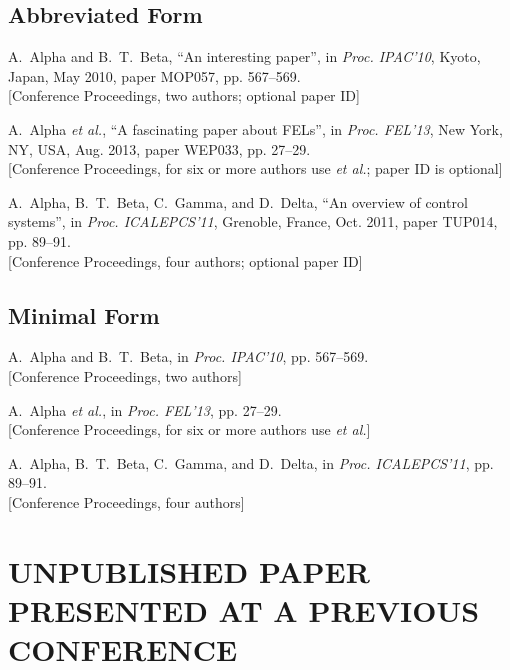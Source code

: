 \documentclass[a4paper,
              ]{jacow}
\begin{document}
\newpage
\subsection{Abbreviated Form}

\begin{thebibliography}{9} %
	A.~Alpha and B.~T.~Beta, “An interesting paper”, 
	in \textit{Proc. IPAC’10}, 
	Kyoto, Japan, May 2010, 
	paper MOP057, pp. 567--569.\\
	\textcolor{jgreen}{[Conference Proceedings, two authors; optional paper ID]}
	
	A.~Alpha \emph{et al.}, 
	“A fascinating paper about FELs”, 
	in \emph{Proc. FEL’13}, 
	New York, NY, USA, Aug. 2013, 
	paper WEP033, pp. 27--29.\\
	\textcolor{jgreen}{[Conference Proceedings, for six or more authors use \emph{et al.};	
		paper ID is optional]}
	
	A.~Alpha, B.~T.~Beta, C.~Gamma, and D.~Delta, 
	“An overview of control systems”, 
	in \emph{Proc. ICALEPCS’11}, Grenoble, France, Oct. 2011, 
	paper TUP014, pp. 89--91.\\
	\textcolor{jgreen}{[Conference Proceedings, four authors; optional paper ID]}
\end{thebibliography}

\subsection{Minimal Form}

\begin{thebibliography}{9} %

	A.~Alpha and B.~T.~Beta,
	in \textit{Proc. IPAC’10}, 
	pp. 567--569.\\
	\textcolor{jgreen}{[Conference Proceedings, two authors]}
	
	A.~Alpha \emph{et al.}, 
	in \emph{Proc. FEL’13}, 
	pp. 27--29.\\
	\textcolor{jgreen}{[Conference Proceedings, for six or more authors use \emph{et al.}]}
	
	A.~Alpha, B.~T.~Beta, C.~Gamma, and D.~Delta, 
	in \emph{Proc. ICALEPCS’11}, 
	pp. 89--91.\\
	\textcolor{jgreen}{[Conference Proceedings, four authors]}
\end{thebibliography}

\section{UNPUBLISHED PAPER PRESENTED AT A PREVIOUS CONFERENCE}
\end{document}
